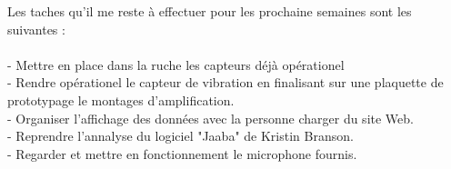 \documentclass[11pt,french,a4paper]{article}
\begin{document}
Les taches qu'il me reste à effectuer pour les prochaine semaines sont les suivantes :
\\
\\- Mettre en place dans la ruche les capteurs déjà opérationel
\\- Rendre opérationel le capteur de vibration en finalisant sur une plaquette de prototypage le montages d'amplification.
\\- Organiser l'affichage des données avec la personne charger du site Web. 
\\- Reprendre l'annalyse du logiciel "Jaaba" de  Kristin Branson. 
\\- Regarder et mettre en fonctionnement le microphone fournis.
\newpage
\listoffigures
\end{document}
